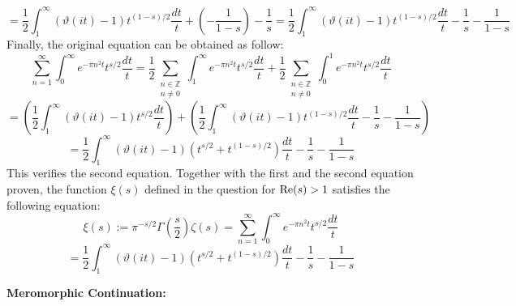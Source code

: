 \documentclass{article}
\begin{document}
$$ = \frac{1}{2}\int_{1}^{\infty}(\vartheta(it)-1)t^{(1-s)/2}\frac{dt}{t}+\left(-\frac{1}{1-s}\right) - \frac{1}{s} = \frac{1}{2}\int_{1}^{\infty}(\vartheta(it)-1)t^{(1-s)/2}\frac{dt}{t} - \frac{1}{s}-\frac{1}{1-s}$$
Finally, the original equation can be obtained as follow:
$$\sum_{n=1}^{\infty}\int_{0}^{\infty}e^{-\pi n^2t}t^{s/2}\frac{dt}{t} = \frac{1}{2}\sum_{\substack{n\in\mathbb{Z}\\n\neq 0}}\int_{1}^{\infty}e^{-\pi n^2t}t^{s/2}\frac{dt}{t}+\frac{1}{2}\sum_{\substack{n\in\mathbb{Z}\\n\neq 0}}\int_{0}^{1}e^{-\pi n^2t}t^{s/2}\frac{dt}{t}$$
$$ = \left(\frac{1}{2}\int_{1}^{\infty}(\vartheta(it)-1)t^{s/2}\frac{dt}{t}\right)+\left(\frac{1}{2}\int_{1}^{\infty}(\vartheta(it)-1)t^{(1-s)/2}\frac{dt}{t} - \frac{1}{s}-\frac{1}{1-s}\right)$$
$$ = \frac{1}{2}\int_{1}^{\infty}(\vartheta(it)-1)(t^{s/2}+t^{(1-s)/2})\frac{dt}{t}-\frac{1}{s}-\frac{1}{1-s}$$
This verifies the second equation. Together with the first and the second equation proven, the function $\xi(s)$ defined in the question for $\textmd{Re}(s)>1$ satisfies the following equation:
$$\xi(s):=\pi ^{-s/2}\Gamma\left(\frac{s}{2}\right)\zeta(s)=\sum_{n=1}^{\infty}\int_{0}^{\infty}e^{-\pi n^2t}t^{s/2}\frac{dt}{t}$$
$$=\frac{1}{2}\int_{1}^{\infty}(\vartheta(it)-1)(t^{s/2}+t^{(1-s)/2})\frac{dt}{t}-\frac{1}{s}-\frac{1}{1-s}$$

\hfil

\textbf{Meromorphic Continuation:}
\end{document}
